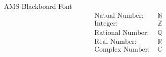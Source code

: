 \documentclass[10pt]{article}
\begin{document}
    \begin{center}
        {\LARGE AMS Blackboard Font}
        \begin{align*}
            \text{Natual Number: }& \mathbb{N}\\
            \text{Integer: }& \mathbb{Z}\\
            \text{Rational Number: }& \mathbb{Q}\\
            \text{Real Number: }& \mathbb{R}\\
            \text{Complex Number: }& \mathbb{C}\\
        \end{align*}
    \end{center}
\end{document}
